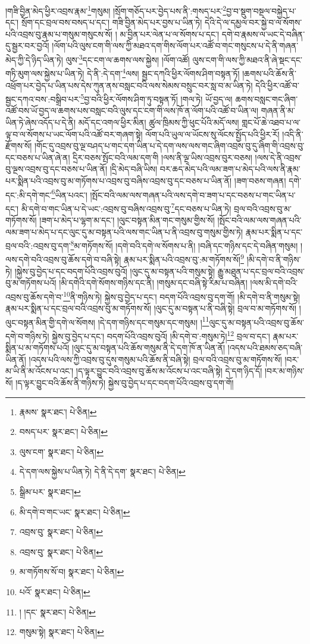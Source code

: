 །གཟི་བྱིན་མེད་ཕྱིར་འབྲས་རྣམ་\footnote{རྣམས་  སྣར་ཐང་།  པེ་ཅིན། }གསུམ། །སྲོག་གཅོད་པར་བྱེད་པས་ནི་:གསད་པར་\footnote{བསད་པར་  སྣར་ཐང་།  པེ་ཅིན། }བྱ་བ་སྡུག་བསྔལ་བསྐྱེད་པ་དང་། སྲོག་དང་བྲལ་བས་བསད་པ་དང་། གཟི་བྱིན་མེད་པར་བྱས་པ་ཡིན་ཏེ། དེའི་དེ་ལ་དམྱལ་བར་སྐྱེ་བ་ལ་སོགས་པའི་འབྲས་བུ་རྣམ་པ་གསུམ་གསུངས་སོ། །
མ་བྱིན་པར་ལེན་པ་ལ་སོགས་པ་དང་། དགེ་བ་རྣམས་ལ་ཡང་དེ་བཞིན་དུ་སྦྱར་བར་བྱའོ། །ལོག་པའི་ལུས་ངག་གི་ལས་ཀྱི་མཐའ་དག་གིས་ལོག་པར་འཚོ་བ་གང་གསུངས་པ་དེ་ནི་གཞན་མེད་ཀྱི་དེ་ཉིད་ཡིན་ཏེ། ལུས་\footnote{ལུས་ངག་  སྣར་ཐང་།  པེ་ཅིན། }དང་ངག་ལ་ཆགས་ལས་སྐྱེས། །ལོག་འཚོ། ལུས་ངག་གི་ལས་ཀྱི་མཐའ་ནི་ཞེ་སྡང་དང་གཏི་མུག་ལས་སྐྱེས་པ་ཡིན་ཏེ། དེ་ནི་:དེ་དག་\footnote{དེ་དག་ལས་སྐྱེས་པ་ཡིན་ཏེ། དེ་ནི་དེ་དག་  སྣར་ཐང་།  པེ་ཅིན། }ལས། སྦྱང་དཀའི་ཕྱིར་ལོགས་ཤིག་བསྟན་ཏོ། །ཆགས་པའི་ཆོས་ནི་འཕྲོག་པར་བྱེད་པ་ཡིན་པས་དེས་ཀུན་ནས་བསླང་བའི་ལས་སེམས་བསྲུང་བར་སླ་བ་མ་ཡིན་ཏེ། དེའི་ཕྱིར་འཚོ་བ་སྦྱང་དཀའ་བས་:བསྒྲིབ་པར་\footnote{སྒྲིམ་པར་  སྣར་ཐང་། }བྱ་བའི་ཕྱིར་ལོགས་ཤིག་ཏུ་བསྟན་ཏོ། །གལ་ཏེ། ཡོ་བྱད་ལ། ཆགས་བསླང་གང་ཞིག་འཚོ་བས་ཡོ་བྱད་ལ་ཆགས་པས་བསླང་བའི་ལུས་དང་ངག་གི་ལས་ཁོ་ན་ལོག་པའི་འཚོ་བ་ཡིན་ལ། གཞན་ནི་མ་ཡིན་ཏེ་ཞེས་འདོད་པ་དེ་ནི། མདོ་དང་འགལ་ཕྱིར་མིན། ཚུལ་ཁྲིམས་ཀྱི་ཕུང་པོའི་མདོ་ལས། གླང་པོ་ཆེ་འཐབ་པ་ལ་ལྟ་བ་ལ་སོགས་པ་ཡང་ལོག་པའི་འཚོ་བར་གཞག་སྟེ། ལོག་པའི་ཡུལ་ལ་ཡོངས་སུ་ལོངས་སྤྱོད་པའི་ཕྱིར་རོ། །འདི་ནི་རྫོགས་སོ། །གོང་དུ་འབྲས་བུ་ལྔ་བཤད་པ་གང་དག་ཡིན་པ་དེ་དག་ལས་ལས་གང་ཞིག་འབྲས་བུ་དུ་ཞིག་གི་འབྲས་བུ་དང་བཅས་པ་ཡིན་ཞེ་ན། དྲིར་བཅས་སྤོང་བའི་ལམ་དག་གི །ལས་ནི་ལྔ་ཡིས་འབྲས་བུར་བཅས། །ལས་དེ་ནི་འབྲས་བུ་ལྔས་འབྲས་བུ་དང་བཅས་པ་ཡིན་ནོ། །དྲི་མེད་བཞི་ཡིས། བར་ཆད་མེད་པའི་ལམ་ཟག་པ་མེད་པའི་ལས་ནི་རྣམ་པར་སྨིན་པའི་འབྲས་བུ་མ་གཏོགས་པ་འབྲས་བུ་བཞིས་འབྲས་བུ་དང་བཅས་པ་ཡིན་ནོ། །ཟག་བཅས་གཞན། དགེ་དང་:མི་དགེ་གང་\footnote{མི་དགེ་བ་གང་ཡང་  སྣར་ཐང་།  པེ་ཅིན། }ཡིན་པའང་། །སྤོང་བའི་ལམ་ལས་གཞན་པའི་ལས་དགེ་བ་ཟག་པ་དང་བཅས་པ་གང་ཡིན་པ་དང་། མི་དགེ་བ་གང་ཡིན་པ་དེ་ཡང་:འབྲས་བུ་བཞིས་འབྲས་བུ་\footnote{འབྲས་བུ་  སྣར་ཐང་།  པེ་ཅིན། }དང་བཅས་པ་ཡིན་ཏེ། བྲལ་བའི་འབྲས་བུ་མ་གཏོགས་སོ། །ཟག་པ་མེད་པ་ལྷག་མ་དང་། །ལུང་བསྟན་མིན་གང་གསུམ་གྱིས་སོ། །སྤོང་བའི་ལམ་ལས་གཞན་པའི་ལམ་ཟག་པ་མེད་པ་དང་ལུང་དུ་མ་བསྟན་པའི་ལས་གང་ཡིན་པ་ནི་འབྲས་བུ་གསུམ་གྱིས་ཏེ། རྣམ་པར་སྨིན་པ་དང་བྲལ་བའི་:འབྲས་བུ་དག་\footnote{འབྲས་བུ་  སྣར་ཐང་།  པེ་ཅིན། }མ་གཏོགས་སོ། །དགེ་བའི་དགེ་ལ་སོགས་པ་ནི། །བཞི་དང་གཉིས་དང་དེ་བཞིན་གསུམ། །ལས་དགེ་བའི་འབྲས་བུ་ཆོས་དགེ་བ་བཞི་སྟེ། རྣམ་པར་སྨིན་པའི་འབྲས་བུ་:མ་གཏོགས་སོ།\footnote{མ་གཏོགས་སོ་བ།  སྣར་ཐང་།  པེ་ཅིན། } །མི་དགེ་བ་ནི་གཉིས་ཏེ། །སྐྱེས་བུ་བྱེད་པ་དང་བདག་པོའི་འབྲས་བུའོ། །ལུང་དུ་མ་བསྟན་པའི་གསུམ་སྟེ། རྒྱུ་མཐུན་པ་དང་བྲལ་བའི་འབྲས་བུ་མ་གཏོགས་པའོ། །མི་དགེའི་དགེ་སོགས་གཉིས་དང་ནི། །གསུམ་དང་བཞི་སྟེ་རིམ་པ་བཞིན། །ལས་མི་དགེ་བའི་འབྲས་བུ་ཆོས་དགེ་བ་\footnote{པའོ་  སྣར་ཐང་།  པེ་ཅིན། }ནི་གཉིས་ཏེ། སྐྱེས་བུ་བྱེད་པ་དང་། བདག་པོའི་འབྲས་བུ་དག་གོ། །མི་དགེ་བ་ནི་གསུམ་སྟེ། རྣམ་པར་སྨིན་པ་དང་བྲལ་བའི་འབྲས་བུ་མ་གཏོགས་སོ། །ལུང་དུ་མ་བསྟན་པ་ནི་བཞི་སྟེ། བྲལ་བ་མ་གཏོགས་སོ། །ལུང་བསྟན་མིན་གྱི་དགེ་ལ་སོགས། །དེ་དག་གཉིས་དང་གསུམ་དང་གསུམ། །\footnote{། །དང་  སྣར་ཐང་།  པེ་ཅིན། }ལུང་དུ་མ་བསྟན་པའི་འབྲས་བུ་ཆོས་དགེ་བ་གཉིས་ཏེ། སྐྱེས་བུ་བྱེད་པ་དང་། བདག་པོའི་འབྲས་བུའོ། །མི་དགེ་བ་:གསུམ་ཏེ།\footnote{གསུམ་སྟེ།  སྣར་ཐང་།  པེ་ཅིན། } བྲལ་བ་དང་། རྣམ་པར་སྨིན་པ་མ་གཏོགས་པའོ། །ལུང་དུ་མ་བསྟན་པའི་ཆོས་གསུམ་ནི་དེ་དག་ཁོ་ན་ཡིན་ནོ། །འདས་པའི་ཐམས་ཅད་བཞི་ཡིན་ནོ། །འདས་པའི་ལས་ཀྱི་འབྲས་བུ་དུས་གསུམ་པའི་ཆོས་ནི་བཞི་སྟེ། བྲལ་བའི་འབྲས་བུ་མ་གཏོགས་སོ། །བར་མ་ཡི་ནི་མ་འོངས་པ་འང་། །ད་ལྟར་བྱུང་བའི་འབྲས་བུ་ཆོས་མ་འོངས་པ་འང་བཞི་སྟེ། དེ་དག་ཉིད་དོ། །བར་མ་གཉིས་སོ། །ད་ལྟར་བྱུང་བའི་ཆོས་ནི་གཉིས་ཏེ། སྐྱེས་བུ་བྱེད་པ་དང་བདག་པོའི་འབྲས་བུ་དག་གོ། 